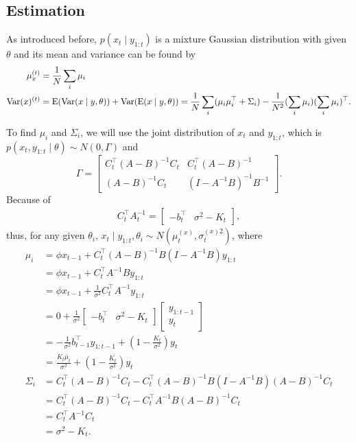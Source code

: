 \subsection*{Estimation}


As introduced before, $p(x_t \mid y_{1:t})$ is a mixture Gaussian distribution with given $\theta$ and its mean and variance can be found by 
\begin{align}
\mu_x^{(t)} &= \frac{1}{N} \sum_i \mu_i\\
\mathrm{Var}(x)^{(t)}  &= \mathrm{E}(\mathrm{Var}(x\mid y,\theta)) + \mathrm{Var}(\mathrm{E}(x\mid y,\theta)) = \frac{1}{N} \sum_i (\mu_i \mu_i^\top +\Sigma_i) -\frac{1}{N^2} (\sum_i  \mu_i) (\sum_i \mu_i)^\top. 
\end{align}

To find $\mu_i$ and $\Sigma_i$, we will use the joint distribution of $x_{t}$ and $y_{1:t}$, which is $p(x_{t}, y_{1:t}  \mid  \theta)\sim N(0,\Gamma)$ and 
\begin{equation*}
\Gamma=\begin{bmatrix} C_{t}^\top(A-B)^{-1}C_{t} & C_{t}^\top(A-B)^{-1}\\(A-B)^{-1}C_{t} & (I-A^{-1}B)^{-1}B^{-1} \end{bmatrix}.
\end{equation*}
Because of 
\begin{align*}
C_{t}^\top A_{t}^{-1} = \left[\begin{matrix} - b_{t}^\top & \sigma^2- K_{t} \end{matrix} \right],
\end{align*}
thus, for any given $\theta_i$, $x_{t}\mid y_{1:t},\theta_i \sim N(\mu_{t}^{(x)},\sigma_{t}^{(x)2})$, where
\begin{align*}
\mu_i  &= \phi \hat{x}_{t-1} +  C_{t}^\top (A-B)^{-1}B (I-A^{-1}B)y_{1:t}\\
                      &= \phi \hat{x}_{t-1} +  C_{t}^\top A^{-1}B y_{1:t} \\ &= \phi \hat{x}_{t-1} +  \frac{1}{\sigma^2}C_{t}^\top A^{-1} y_{1:t}\\
                      &=0+  \frac{1}{\sigma^2}\left[\begin{matrix} - b_{t}^\top & \sigma^2- K_{t} \end{matrix} \right]  \left[\begin{matrix} y_{1:t-1} \\ y_{t} \end{matrix} \right] \\
                      &= - \frac{1}{\sigma^2}b_{t-1}^\top y_{1:t-1}+(1-\frac{K_{t}}{\sigma^2})y_{t}\\
                      &=\frac{K_{t}\bar{\mu}_{t}}{\sigma^2}+(1-\frac{K_{t}}{\sigma^2})y_{t} \\
\Sigma_i&=C_{t}^\top(A-B)^{-1}C_{t}-  C_{t}^\top(A-B)^{-1}  B(I-A^{-1}B) (A-B)^{-1}C_{t}\\
                      &= C_{t}^\top(A-B)^{-1}C_{t} -  C_{t}^\top A^{-1}B(A-B)^{-1}C_{t}\\
                      &= C_{t}^\top A^{-1}C_{t} \\ &= \sigma^2-K_{t}.
\end{align*}
